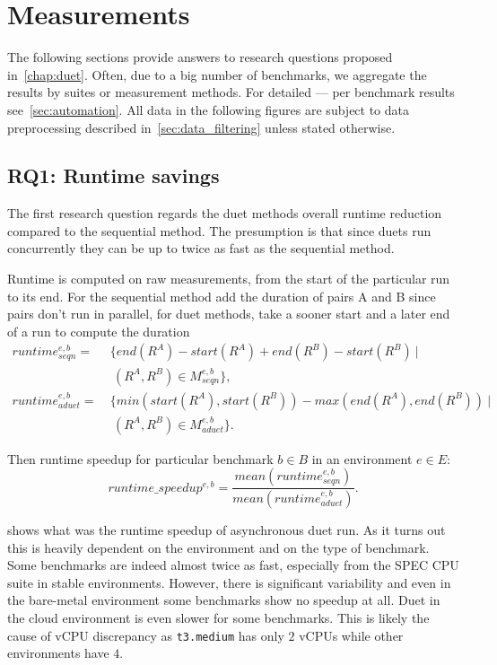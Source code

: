 \section{Measurements}
\label{sec:measurements}

The following sections provide answers to research questions proposed in~\cref{chap:duet}.
Often, due to a big number of benchmarks, we aggregate the results by suites or measurement methods.
For detailed --- per benchmark results see~\cref{sec:automation}.
All data in the following figures are subject to data preprocessing described in~\cref{sec:data_filtering} unless stated otherwise.

\subsection{RQ1: Runtime savings}
\label{sec:rq1}

The first research question regards the duet methods overall runtime reduction compared to the sequential method.
The presumption is that since duets run concurrently they can be up to twice as fast as the sequential method.

Runtime is computed on raw measurements, from the start of the particular run to its end.
For the sequential method add the duration of pairs A and B since pairs don't run in parallel, for duet methods, take a sooner start and a later end of a run to compute the duration
\begin{align*}
runtime^{e, b}_{seqn}  =&~\{end(R^A) - start(R^A) + end(R^B) - start(R^B)~|\\
                        &~~(R^A, R^B) \in M^{e, b}_{seqn}\}, \\
runtime^{e, b}_{aduet} =&~\{min(start(R^A), start(R^B)) - max(end(R^A), end(R^B))~|\\
                        &~~(R^A, R^B) \in M^{e, b}_{aduet}\}.
\end{align*}

Then runtime speedup for particular benchmark $b \in B$ in an environment $e \in E$:
\begin{equation}\label{eq:runtimespeedup}
runtime\_speedup^{e, b} = \frac{mean(runtime^{e, b}_{seqn})}{mean(runtime^{e, b}_{aduet})}.
\end{equation}

 shows what was the runtime speedup of asynchronous duet run.
As it turns out this is heavily dependent on the environment and on the type of benchmark.
Some benchmarks are indeed almost twice as fast, especially from the SPEC CPU suite in stable environments.
However, there is significant variability and even in the \mbox{bare-metal} environment some benchmarks show no speedup at all.
Duet in the cloud environment is even slower for some benchmarks.
This is likely the cause of vCPU discrepancy as \lstinline{t3.medium} has only $2$ vCPUs while other environments have $4$.

